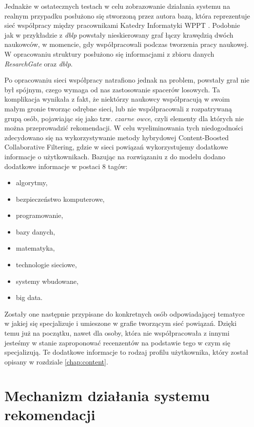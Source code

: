 Jednakże w ostatecznych testach w celu zobrazowanie działania systemu na realnym przypadku posłużono się stworzoną przez autora bazą, która reprezentuje sieć współpracy między pracownikami Katedry Informatyki WPPT \cite{WPPTKatedra}. Podobnie jak w przykładzie z \textit{dblp } powstały nieskierowany graf łączy krawędzią dwóch naukowców, w momencie, gdy współpracowali podczas tworzenia pracy naukowej. W opracowaniu struktury posłużono się informacjami z zbioru danych \textit{ResarchGate} oraz \textit{dblp}. 

Po opracowaniu sieci współpracy natrafiono jednak na problem, powstały grał nie był spójnym, czego wymaga od nas zastosowanie spacerów losowych. Ta komplikacja wynikała z fakt, że niektórzy naukowcy współpracują w swoim małym gronie tworząc odrębne sieci, lub nie współpracowali z rozpatrywaną grupą osób, pojawiając się jako tzw. \textit{czarne owce}, czyli elementy dla których nie można przeprowadzić rekomendacji. W celu wyeliminowania tych niedogodności zdecydowano się na wykorzystywanie metody hybrydowej Content-Boosted Collaborative Filtering, gdzie w sieci powiązań wykorzystujemy dodatkowe informacje o użytkownikach. Bazując na rozwiązaniu z \cite{MovieRecommendationusingRandomWalksovertheContextualGraph} do modelu dodano dodatkowe informacje w postaci 8 tagów:
\begin{itemize}
    \item algorytmy,
    \item bezpieczeństwo komputerowe,
    \item programowanie,
    \item bazy danych,
    \item matematyka,
    \item technologie sieciowe,
    \item systemy wbudowane,
    \item big data.
\end{itemize}
Zostały one następnie przypisane do konkretnych osób odpowiadającej tematyce w jakiej się specjalizuje i umieszone w grafie tworzącym sieć powiązań. Dzięki temu już na początku, nawet dla osoby, która nie współpracowała z innymi jesteśmy w stanie zaproponować recenzentów na podstawie tego w czym się specjalizują. Te dodatkowe informacje to rodzaj profilu użytkownika, który został opisany w rozdziale \ref{chap:content}.

\section{Mechanizm działania systemu rekomendacji}


